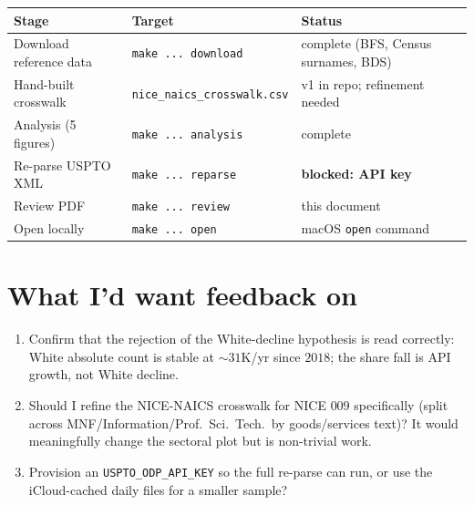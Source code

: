 \documentclass[11pt]{article}
\begin{document}
\begin{tabular}{lll}
\toprule
Stage & Target & Status \\
\midrule
Download reference data & \texttt{make ... download}   & complete (BFS, Census surnames, BDS) \\
Hand-built crosswalk    & \texttt{nice\_naics\_crosswalk.csv} & v1 in repo; refinement needed \\
Analysis (5 figures)    & \texttt{make ... analysis}   & complete \\
Re-parse USPTO XML      & \texttt{make ... reparse}    & \textcolor{flagcolor}{\textbf{blocked: API key}} \\
Review PDF              & \texttt{make ... review}     & this document \\
Open locally            & \texttt{make ... open}       & macOS \texttt{open} command \\
\bottomrule
\end{tabular}

\section*{What I'd want feedback on}
\begin{enumerate}\setlength\itemsep{2pt}
\item Confirm that the rejection of the White-decline hypothesis is
read correctly: White absolute count is stable at $\sim 31$K/yr since
$2018$; the share fall is API growth, not White decline.
\item Should I refine the NICE-NAICS crosswalk for NICE $009$
specifically (split across MNF/Information/Prof.\ Sci.\ Tech.\ by
goods/services text)? It would meaningfully change the sectoral
plot but is non-trivial work.
\item Provision an \texttt{USPTO\_ODP\_API\_KEY} so the full re-parse
can run, or use the iCloud-cached daily files for a smaller sample?
\end{enumerate}
\end{document}
